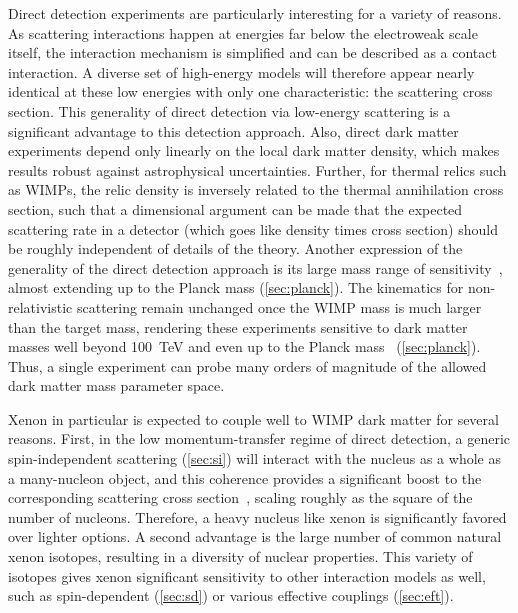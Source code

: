 Direct detection experiments are particularly interesting for a variety of reasons. As scattering interactions happen at energies far below the electroweak scale itself, the interaction mechanism is simplified and can be described as a contact interaction. A diverse set of high-energy models will therefore appear nearly identical at these low energies with only one characteristic: the scattering cross section. This generality of direct detection via low-energy scattering is a significant advantage to this detection approach. Also, direct dark matter experiments depend only linearly on the local dark matter density, which makes results robust against astrophysical uncertainties. Further, for thermal relics such as WIMPs, the relic density is inversely related to the thermal annihilation cross section, such that a dimensional argument can be made that the expected scattering rate in a detector (which goes like density times cross section) should be roughly independent of details of the theory. 
Another expression of the generality of the direct detection approach is its large mass range of sensitivity~\cite{Smith:1986ms}, almost extending up to the Planck mass (\autoref{sec:planck}). The kinematics for non-relativistic scattering remain unchanged once the WIMP mass is much larger than the target mass, rendering these experiments sensitive to dark matter masses well beyond 100~TeV and even up to the Planck mass~\cite{Bramante:2018qbc} (\autoref{sec:planck}). Thus, a single experiment can probe many orders of magnitude of the allowed dark matter mass parameter space.

Xenon in particular is expected to couple well to WIMP dark matter for several reasons. First, in the low momentum-transfer regime of direct detection, a generic spin-independent scattering (\autoref{sec:si}) will interact with the nucleus as a whole as a many-nucleon object, and this coherence provides a significant boost to the corresponding scattering cross section~\cite{Smith:1983jj,Goodman:1984dc}, scaling roughly as the square of the number of nucleons. Therefore, a heavy nucleus like xenon is significantly favored over lighter options. A second advantage is the large number of common natural xenon isotopes, resulting in a diversity of nuclear properties. This variety of isotopes gives xenon significant sensitivity to other interaction models as well, such as spin-dependent (\autoref{sec:sd}) or various effective couplings (\autoref{sec:eft}).

